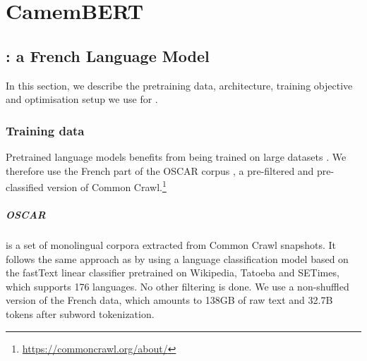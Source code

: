 \chapter{CamemBERT}

\section{\camembert: a French Language Model}\label{sec:Camembert}
In this section, we describe the pretraining data, architecture, training objective and optimisation setup we use for \camembert.


\subsection{Training data}
Pretrained language models benefits from being trained on large datasets \cite{devlin-etal-2019-bert,liu-etal-2019-roberta,raffel-etal-2020-exploring}. %
We therefore use the French part of the OSCAR corpus \cite{ortiz-suarez-etal-2019-asynchronous}, a pre-filtered and pre-classified version of Common Crawl.\footnote{\url{https://commoncrawl.org/about/}} %

\paragraph{OSCAR} is a set of monolingual corpora extracted from Common Crawl snapshots{}. It follows the same approach as \cite{grave-etal-2018-learning} by using a language classification model based on the fastText linear classifier \cite{joulin-etal-2016-fasttext,joulin-etal-2017-bag} pretrained on Wikipedia, Tatoeba and SETimes, which supports 176 languages. No other filtering is done. We use a non-shuffled version of the French data, which amounts to 138GB of raw text and 32.7B tokens after subword tokenization.%

